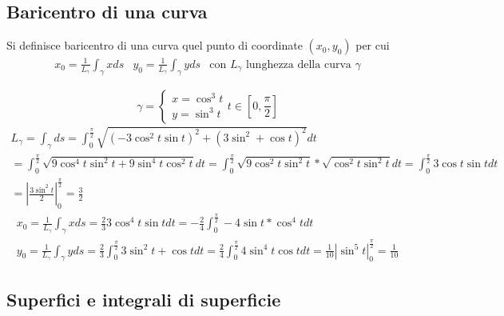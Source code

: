 \subsection{Baricentro di una curva}
Si definisce {\color{red} baricentro di una curva} quel punto di coordinate
$(x_0,y_0)$ per cui
\begin{equation*}
	\begin{matrix}
		x_0=\frac{1}{L_\gamma}\int_\gamma x ds & y_0=\frac{1}{L_\gamma}
		\int_\gamma yds & \text{con $L_\gamma$ lunghezza della curva $\gamma$}
	\end{matrix}
\end{equation*}
\begin{esempio}
	\begin{equation*}
		\gamma=\begin{cases}
			x=\cos^3t\\
			y=\sin^3 t
		\end{cases} t\in \left[0,\frac{\pi}{2}\right]
	\end{equation*}
	\begin{equation*}
		\begin{matrix}
				L_\gamma=\int_{\gamma}ds=\int_{0}^{\frac{\pi}{2}}\sqrt{(-3\cos^2t\sin
			t)^2+(3\sin^2+\cos t)^2} dt\\
			=\int_{0}^{\frac{\pi}{2}}\sqrt{9\cos^4t\sin^2t+9\sin^4t\cos^2t}dt= 
			\int_{0}^{\frac{\pi}{2}}\sqrt{9\cos^2t\sin^2t}*\sqrt{\cos^2t\sin^2t}
			dt = \int_{0}^{\frac{\pi}{2}}3\cos t\sin t dt\\=\left|
			\frac{3\sin^2t}{2}\right|_{0}^{\frac{\pi}{2}}=\frac{3}{2}
		\end{matrix}
	\end{equation*}
	\begin{equation*}
		\begin{matrix}
			x_0=\frac{1}{L_\gamma}\int_\gamma xds=\frac{2}{3}3\cos^4t\sin tdt=
			-\frac{2}{4}\int_{0}^{\frac{\pi}{2}}-4\sin t*\cos^4tdt\\
			y_0=\frac{1}{L_\gamma}\int_\gamma
			yds=\frac{2}{3}\int_{0}^{\frac{\pi}{2}}3\sin^2t+\cos t
			dt=\frac{2}{4}\int_{0}^{\frac{\pi}{2}}4\sin^4t\cos t
			dt=\frac{1}{10} \left|\sin^5t\right|_0^{\frac{\pi}{2}}=\frac{1}{10}
		\end{matrix}
	\end{equation*}
\end{esempio}
\subsection{Superfici e integrali di superficie}
